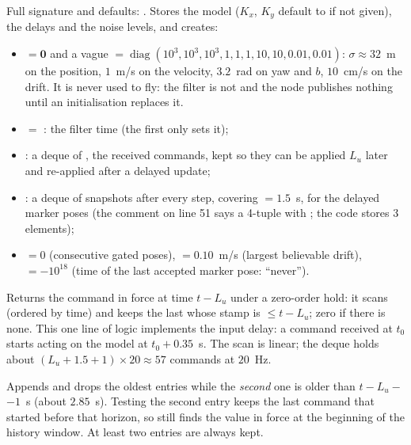 Full signature and defaults: .
Stores the model ($K_x$, $K_y$ default to  if not given), the delays and the noise levels, and creates:
\begin{itemize}[nosep]
\item {} $=\mathbf 0$ and a vague  $=\operatorname{diag}(10^3,10^3,10^3,1,1,1,10,10,0.01,0.01)$:
  $\sigma\approx 32$~m on the position, $1$~m/s on the velocity, $3.2$~rad on yaw and $b$, $10$~cm/s on the drift.
  It is never used to fly: the filter is not  and the node publishes nothing until an initialisation replaces it.
\item {} $=$ : the filter time (the first  only sets it);
\item {}: a deque of , the received commands, kept so they can be applied $L_u$ later and re-applied
  after a delayed update;
\item {}: a deque of  snapshots after every step, covering  $=1.5$~s, for the delayed
  marker poses (the comment on line 51 says a 4-tuple with ; the code stores 3 elements);
\item {} $=0$ (consecutive gated poses),  $=0.10$~m/s (largest believable drift),
   $=-10^{18}$ (time of the last accepted marker pose: ``never'').
\end{itemize}

Returns the command in force at time $t-L_u$ under a zero-order hold: it scans  (ordered by time) and keeps
the last  whose stamp is $\le t - L_u$; zero if there is none. This one line of logic implements the input delay:
a command received at $t_0$ starts acting on the model at $t_0 + 0.35$~s. The scan is linear; the deque holds about
$(L_u + 1.5 + 1)\times 20 \approx 57$ commands at $20$~Hz.

Appends  and drops the oldest entries while the \emph{second} one is older than $t - L_u - $
 $- 1$~s (about $2.85$~s). Testing the second entry keeps the last command that started before that
horizon, so  still finds the value in force at the beginning of the history window. At least two entries
are always kept.

